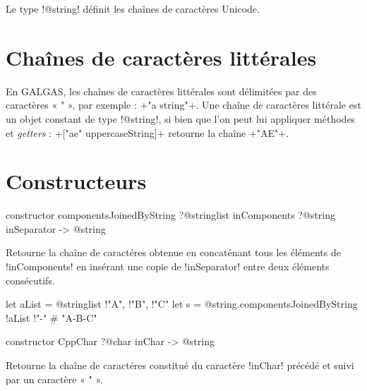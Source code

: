 



Le type \ggsq!@string! définit les chaînes de caractères Unicode.

\section{Chaînes de caractères littérales}

En GALGAS, les chaînes de caractères littérales sont délimitées par des caractères « " », par exemple : \ggsq+"a string"+. Une chaîne de caractères littérale est un objet constant de type \ggsq!@string!, si bien que l'on peut lui appliquer méthodes et \emph{getters} : \ggsq+["ae" uppercaseString]+ retourne la chaîne \ggsq+"AE"+.







\section{Constructeurs}


\begin{galgas4box}
constructor componentsJoinedByString
   ?@stringlist inComponents
   ?@string inSeparator -> @string
\end{galgas4box}

Retourne la chaîne de caractéres obtenue en concaténant tous les éléments de \ggsq!inComponents! en insérant une copie de \ggsq!inSeparator! entre deux éléments consécutifs.

\begin{galgas4}
let aList = @stringlist {!"A", !"B", !"C"}
let s = @string.componentsJoinedByString {!aList !"-"} # "A-B-C"
\end{galgas4}





\begin{galgas4box}
constructor CppChar ?@char inChar -> @string
\end{galgas4box}

Retourne la chaîne de caractéres constitué du caractère \ggsq!inChar! précédé et suivi par un caractère « " ».

